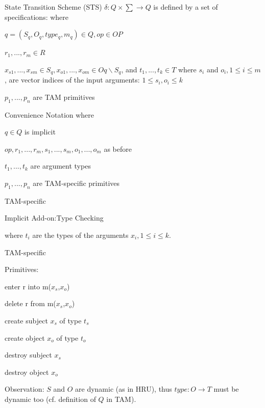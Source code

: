 \documentclass[a4paper]{article}
\begin{document}
\begin{multicols}{3}
    State Transition Scheme (STS)
    $\delta:Q\times\sum\rightarrow Q$ is defined by a set of specifications:
    where
    \begin{itemize*}
        \item $q= (S_q,O_q,type_q,m_q)\in Q,op\in OP$
        \item $r_1,...,r_m\in R$
        \item $x_{s1},...,x_{sm}\in S_q,x_{o1},...,x_{om}\in Oq\backslash S_q$, and $t_1,...,t_k\in T$ where $s_i$ and $o_i, 1\leq i\leq m$ , are vector indices of the input arguments: $1\leq s_i,o_i\leq k$
        \item $p_1,...,p_n$ are TAM primitives
    \end{itemize*}

    Convenience Notation where
    \begin{itemize*}
        \item %
        \item $q\in Q$ is implicit
        \item $op,r_1 ,...,r_m,s_1 ,...,s_m,o_1 ,...,o_m$ as before
        \item $t_1 ,...,t_k$ are argument types
        \item $p_1 ,...,p_n$ are TAM-specific primitives
    \end{itemize*}

    TAM-specific
    \begin{itemize*}
        \item Implicit Add-on:Type Checking
        \item %
        \item where $t_i$ are the types of the arguments $x_i, 1\leq i\leq k$.
    \end{itemize*}

    TAM-specific
    \begin{itemize*}
        \item Primitives:
        \begin{itemize*}
            \item enter r into m($x_s$,$x_o$)
            \item delete r from m($x_s$,$x_o$)
            \item create subject $x_s$ of type $t_s$
            \item create object $x_o$ of type $t_o$
            \item destroy subject $x_s$
            \item destroy object $x_o$
        \end{itemize*}
        \item Observation: $S$ and $O$ are dynamic (as in HRU), thus $type:O\rightarrow T$ must be dynamic too (cf. definition of $Q$ in TAM).
    \end{itemize*}


\end{multicols}
\end{document}
